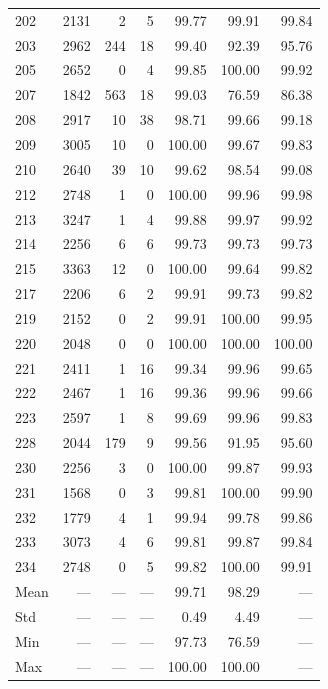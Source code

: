 \documentclass[11pt]{article}
\begin{document}
\begin{table}[p]
\begin{tabular}{lrrrrrr}
202 & 2131 & 2 & 5 & 99.77 & 99.91 & 99.84 \\
203 & 2962 & 244 & 18 & 99.40 & 92.39 & 95.76 \\
205 & 2652 & 0 & 4 & 99.85 & 100.00 & 99.92 \\
207 & 1842 & 563 & 18 & 99.03 & 76.59 & 86.38 \\
208 & 2917 & 10 & 38 & 98.71 & 99.66 & 99.18 \\
209 & 3005 & 10 & 0 & 100.00 & 99.67 & 99.83 \\
210 & 2640 & 39 & 10 & 99.62 & 98.54 & 99.08 \\
212 & 2748 & 1 & 0 & 100.00 & 99.96 & 99.98 \\
213 & 3247 & 1 & 4 & 99.88 & 99.97 & 99.92 \\
214 & 2256 & 6 & 6 & 99.73 & 99.73 & 99.73 \\
215 & 3363 & 12 & 0 & 100.00 & 99.64 & 99.82 \\
217 & 2206 & 6 & 2 & 99.91 & 99.73 & 99.82 \\
219 & 2152 & 0 & 2 & 99.91 & 100.00 & 99.95 \\
220 & 2048 & 0 & 0 & 100.00 & 100.00 & 100.00 \\
221 & 2411 & 1 & 16 & 99.34 & 99.96 & 99.65 \\
222 & 2467 & 1 & 16 & 99.36 & 99.96 & 99.66 \\
223 & 2597 & 1 & 8 & 99.69 & 99.96 & 99.83 \\
228 & 2044 & 179 & 9 & 99.56 & 91.95 & 95.60 \\
230 & 2256 & 3 & 0 & 100.00 & 99.87 & 99.93 \\
231 & 1568 & 0 & 3 & 99.81 & 100.00 & 99.90 \\
232 & 1779 & 4 & 1 & 99.94 & 99.78 & 99.86 \\
233 & 3073 & 4 & 6 & 99.81 & 99.87 & 99.84 \\
234 & 2748 & 0 & 5 & 99.82 & 100.00 & 99.91 \\
\midrule
Mean & --- & --- & --- & 99.71 & 98.29 & --- \\
Std  & --- & --- & --- & 0.49  & 4.49  & --- \\
Min  & --- & --- & --- & 97.73 & 76.59 & --- \\
Max  & --- & --- & --- & 100.00 & 100.00 & --- \\
\bottomrule
\end{tabular}
\end{table}



\newpage



\end{document}
